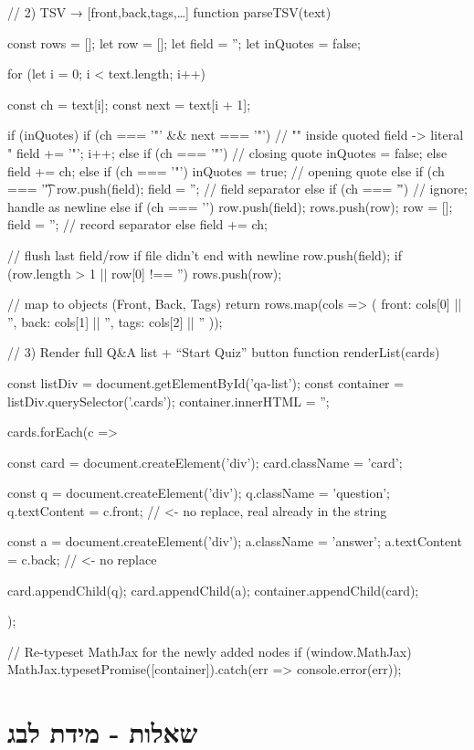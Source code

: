 \documentclass{tstextbook}
\begin{document}
    // 2) TSV → [{front,back,tags},…]
    function parseTSV(text) {
  const rows = [];
  let row = [];
  let field = '';
  let inQuotes = false;

  for (let i = 0; i < text.length; i++) {
    const ch = text[i];
    const next = text[i + 1];

    if (inQuotes) {
      if (ch === '"' && next === '"') {
        // "" inside quoted field -> literal "
        field += '"';
        i++;
      } else if (ch === '"') {
        // closing quote
        inQuotes = false;
      } else {
        field += ch;
      }
    } else {
      if (ch === '"') {
        inQuotes = true;                // opening quote
      } else if (ch === '\t') {
        row.push(field); field = '';    // field separator
      } else if (ch === '\r') {
        // ignore; handle \n as newline
      } else if (ch === '\n') {
        row.push(field); rows.push(row);
        row = []; field = '';           // record separator
      } else {
        field += ch;
      }
    }
  }
  // flush last field/row if file didn't end with newline
  row.push(field);
  if (row.length > 1 || row[0] !== '') rows.push(row);

  // map to objects (Front, Back, Tags)
  return rows.map(cols => ({
    front: cols[0] || '',
    back:  cols[1] || '',
    tags:  cols[2] || ''
  }));
}
// 3) Render full Q&A list + “Start Quiz” button
function renderList(cards) {
  const listDiv = document.getElementById('qa-list');
  const container = listDiv.querySelector('.cards');
  container.innerHTML = '';

  cards.forEach(c => {
    const card = document.createElement('div');
    card.className = 'card';

    const q = document.createElement('div');
    q.className = 'question';
    q.textContent = c.front;   // <- no replace, real \n already in the string

    const a = document.createElement('div');
    a.className = 'answer';
    a.textContent = c.back;    // <- no replace

    card.appendChild(q);
    card.appendChild(a);
    container.appendChild(card);
  });

  // Re-typeset MathJax for the newly added nodes
  if (window.MathJax) {
    MathJax.typesetPromise([container]).catch(err => console.error(err));
  }
}
  \section{שאלות - מידת לבג}
\end{document}
